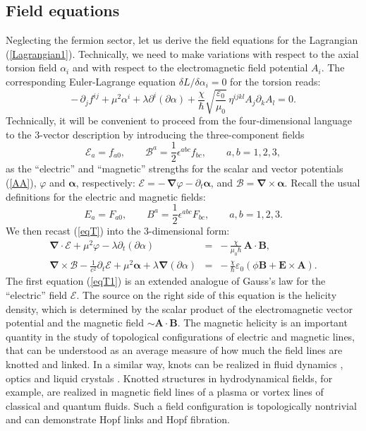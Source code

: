 \documentclass[12pt,prd,showkeys,amsmath,amssymb,nofootinbib]{revtex4-1}
\begin{document}
\subsection{Field equations}


Neglecting the fermion sector, let us derive the field equations for the Lagrangian (\ref{Lagrangian1}). Technically, we need to make variations with respect to the axial torsion field $\alpha_i$ and with respect to the electromagnetic field potential $A_i$. The corresponding Euler-Lagrange equation $\delta L/\delta\alpha_i = 0$ for the torsion reads:
\begin{equation}\label{eqT}
-\,\partial_jf^{ij} + \mu^2\alpha^i + \lambda\partial^i(\partial\alpha)
+ \frac{\chi}{\hbar}\sqrt{\frac {\varepsilon_0}{\mu_0}}\,\eta^{ijkl}A_j\partial_kA_l = 0.
\end{equation}
Technically, it will be convenient to proceed from the four-dimensional language to the 3-vector description by introducing the three-component fields
\begin{equation}\label{EBt}
{\mathcal E}_a = f_{a0},\qquad {\mathcal B}^a = {\frac 12}\epsilon^{abc}f_{bc},\qquad a,b = 1,2,3, 
\end{equation}
as the ``electric'' and ``magnetic'' strengths for the scalar and vector potentials (\ref{AA}), $\varphi$ and $\bm{\alpha}$, respectively: $\bm{\mathcal E} = -\,\bm{\nabla}\varphi - \partial_t\bm{\alpha}$, and $\bm{\mathcal B} = \bm{\nabla}\times\bm{\alpha}$. Recall the usual definitions for the electric and magnetic fields:
\begin{equation}\label{EBm}
 E_a = F_{a0},\qquad B^a = {\frac 12}\epsilon^{abc}F_{bc},\qquad a,b = 1,2,3.
\end{equation}
We then recast (\ref{eqT}) into the 3-dimensional form:
\begin{eqnarray}
\bm{\nabla}\cdot\bm{\mathcal E} + \mu^2\varphi - \lambda\partial_t(\partial\alpha) &=& 
-\,{\frac{\chi}{\mu_0\hbar}}\,\bm{A}\cdot\bm{B},\label{eqT1}\\
\bm{\nabla}\times\bm{\mathcal B} -{\frac 1{c^2}}\partial_t\bm{\mathcal E} + \mu^2\bm{\alpha}
+ \lambda\bm{\nabla}(\partial\alpha) &=& -\,\frac{\chi}{\hbar}\varepsilon_0\left(\phi\bm{B} 
+ \bm{E}\times\bm{A}\right).\label{eqT2}
\end{eqnarray}
The first equation (\ref{eqT1}) is an extended analogue of Gauss's law for the ``electric'' field $\bm{\mathcal E}$. The source on the right side of this equation is the helicity density, which is determined by the scalar product of the electromagnetic vector potential and the magnetic field $\sim \bm{A}\cdot\bm{B}$. The magnetic helicity is an important quantity in the study of topological configurations of electric and magnetic lines, that can be understood as an average measure of how much the field lines are knotted and linked. In a similar way, knots can be realized in fluid dynamics \cite{MAGGIONI201329}, optics \cite{Zhong:21} and liquid crystals \cite{Smalyukh_2020}. Knotted structures in hydrodynamical fields, for example, are realized in magnetic field lines of a plasma \cite{PhysRevLett.115.095001} or vortex lines of classical and quantum fluids. Such a field configuration is topologically nontrivial and can demonstrate Hopf links and Hopf fibration. 
\end{document}
